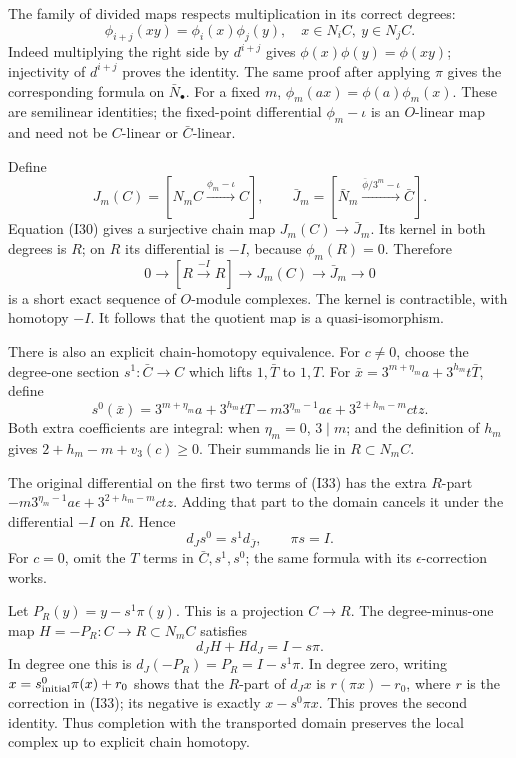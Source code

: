 \documentclass[
  10pt,
]{article}
\begin{document}
The family of divided maps respects multiplication in its correct
degrees: \[
\phi_{i+j}(xy)=\phi_i(x)\phi_j(y),
\quad x\in N_iC,\ y\in N_jC. \tag{I31}
\] Indeed multiplying the right side by \(d^{i+j}\) gives
\(\phi(x)\phi(y)=\phi(xy)\); injectivity of \(d^{i+j}\) proves the
identity. The same proof after applying \(\pi\) gives the corresponding
formula on \(\bar N_\bullet\). For a fixed \(m\),
\(\phi_m(ax)=\phi(a)\phi_m(x)\). These are semilinear identities; the
fixed-point differential \(\phi_m-\iota\) is an \(O\)-linear map and
need not be \(C\)-linear or \(\bar C\)-linear.

Define \[
J_m(C)=[N_mC\xrightarrow{\phi_m-\iota}C],\qquad
\bar J_m=[\bar N_m\xrightarrow{\bar\phi/3^m-\iota}\bar C].
\] Equation (I30) gives a surjective chain map \(J_m(C)\to\bar J_m\).
Its kernel in both degrees is \(R\); on \(R\) its differential is
\(-I\), because \(\phi_m(R)=0\). Therefore \[
0\to[R\xrightarrow{-I}R]\to J_m(C)\to\bar J_m\to0 \tag{I32}
\] is a short exact sequence of \(O\)-module complexes. The kernel is
contractible, with homotopy \(-I\). It follows that the quotient map is
a quasi-isomorphism.

There is also an explicit chain-homotopy equivalence. For \(c\ne0\),
choose the degree-one section \(s^1:\bar C\to C\) which lifts
\(1,\bar T\) to \(1,T\). For \(\bar x=3^{m+\eta_m}a+3^{h_m}t\bar T\),
define \[
s^0(\bar x)=3^{m+\eta_m}a+3^{h_m}tT
-m3^{\eta_m-1}a\epsilon
+3^{2+h_m-m}ctz. \tag{I33}
\] Both extra coefficients are integral: when \(\eta_m=0\), \(3\mid m\);
and the definition of \(h_m\) gives \(2+h_m-m+v_3(c)\ge0\). Their
summands lie in \(R\subset N_mC\).

The original differential on the first two terms of (I33) has the extra
\(R\)-part \(-m3^{\eta_m-1}a\epsilon+3^{2+h_m-m}ctz\). Adding that part
to the domain cancels it under the differential \(-I\) on \(R\). Hence
\[
d_Js^0=s^1d_{\bar J},\qquad \pi s=I.
\] For \(c=0\), omit the \(T\) terms in \(\bar C,s^1,s^0\); the same
formula with its \(\epsilon\)-correction works.

Let \(P_R(y)=y-s^1\pi(y)\). This is a projection \(C\to R\). The
degree-minus-one map \(H=-P_R:C\to R\subset N_mC\) satisfies \[
d_JH+Hd_J=I-s\pi.
\] In degree one this is \(d_J(-P_R)=P_R=I-s^1\pi\). In degree zero,
writing \(x=s^0_{\rm initial}\pi(x)+r_0\) shows that the \(R\)-part of
\(d_Jx\) is \(r(\pi x)-r_0\), where \(r\) is the correction in (I33);
its negative is exactly \(x-s^0\pi x\). This proves the second identity.
Thus completion with the transported domain preserves the local complex
up to explicit chain homotopy.
\end{document}

